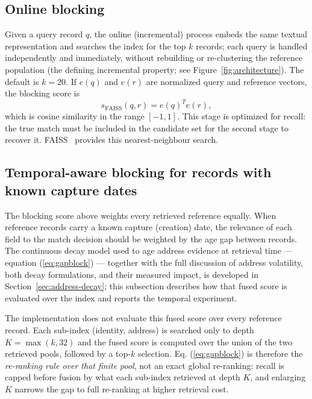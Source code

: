 \documentclass[11pt]{article}
\begin{document}
\subsection{Online blocking}
Given a query record $q$, the online (incremental) process embeds the same textual representation and searches the index for the top $k$ records; each query is handled independently and immediately, without rebuilding or re-clustering the reference population (the defining incremental property; see Figure~\ref{fig:architecture}). The default is $k=20$. If $e(q)$ and $e(r)$ are normalized query and reference vectors, the blocking score is
\[
 s_{\mathrm{FAISS}}(q,r) = e(q)^T e(r),
\]
which is cosine similarity in the range $[-1,1]$. This stage is optimized for recall: the true match must be included in the candidate set for the second stage to recover it. FAISS~\cite{johnson2019} provides this nearest-neighbour search.

\subsection{Temporal-aware blocking for records with known capture dates}
\label{sec:temporal-blocking}
The blocking score above weights every retrieved reference equally. When reference records carry a known capture (creation) date, the relevance of each field to the match decision should be weighted by the age gap between records. The continuous decay model used to age address evidence at retrieval time --- equation (\ref{eq:gapblock}) --- together with the full discussion of address volatility, both decay formulations, and their measured impact, is developed in Section~\ref{sec:address-decay}; this subsection describes how that fused score is evaluated over the index and reports the temporal experiment.

The implementation does not evaluate this fused score over every reference record. Each sub-index (identity, address) is searched only to depth $K=\max(k,32)$ and the fused score is computed over the union of the two retrieved pools, followed by a top-$k$ selection. Eq. (\ref{eq:gapblock}) is therefore the \emph{re-ranking rule over that finite pool}, not an exact global re-ranking: recall is capped before fusion by what each sub-index retrieved at depth $K$, and enlarging $K$ narrows the gap to full re-ranking at higher retrieval cost.
\end{document}
